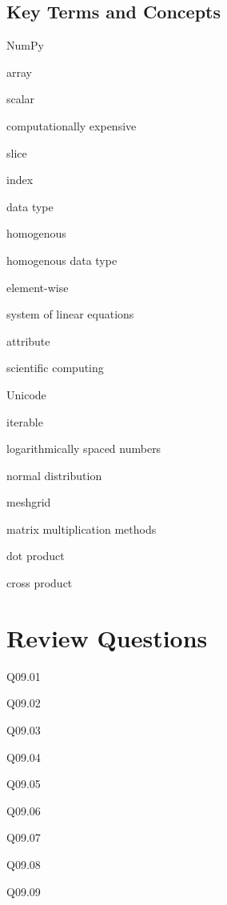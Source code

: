 \documentclass{book}
\newenvironment{problems}{}{}  %
\newenvironment{key_terms}{\begin{multicols}{3}}{\end{multicols}} %
\begin{document}
    
        \subsection{Key Terms and Concepts}\label{key-terms-and-concepts}
    




    
        \begin{key_terms}
        NumPy

array

scalar

computationally expensive

slice

index

data type

homogenous

homogenous data type

element-wise

system of linear equations

attribute

scientific computing

Unicode

iterable

logarithmically spaced numbers

normal distribution

meshgrid

matrix multiplication methods

dot product

cross product
        \end{key_terms}

    




    
        \section{Review Questions}\label{review-questions}
    




    
        \begin{problems}
        Q09.01

Q09.02

Q09.03

Q09.04

Q09.05

Q09.06

Q09.07

Q09.08

Q09.09
        \end{problems}
\end{document}

